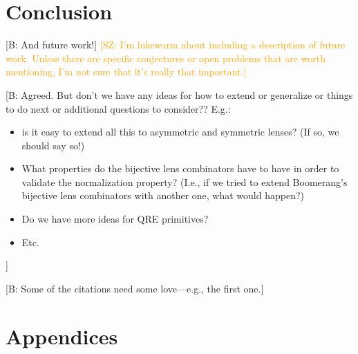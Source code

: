 \documentclass[acmsmall,review,anonymous]{acmart}
\newcommand{\FINISH}[3]{\ifdraft\textcolor{#1}{[#2: #3]}\fi}
\newcommand{\bcp}[1]{\FINISH{dkred}{B}{#1}}
\newcommand{\saz}[1]{\FINISH{orange}{SZ}{#1}}
\begin{document}
\section{Conclusion}
\bcp{And future work!}  \saz{I'm lukewarm about including a description of
future work.  Unless there are specific conjectures or open problems that
are worth mentioning, I'm not sure that it's really that important.}
\bcp{Agreed. But don't we have any ideas for how to extend or generalize or
things to do next or additional questions to consider??  E.g.: 
\begin{itemize}
\item is it easy to extend all this to
asymmetric and symmetric lenses?  (If so, we should say so!)
\item What properties do the bijective lens combinators have to have in
order to validate the normalization property?  (I.e., if we tried to extend
Boomerang's bijective lens combinators with another one, what would happen?)
\item Do we have more ideas for QRE primitives?
\item Etc.
\end{itemize}
}
\label{concl}

\bcp{Some of the citations need some love---e.g., the first one.}




\appendix
{}
\section*{Appendices}
\end{document}
